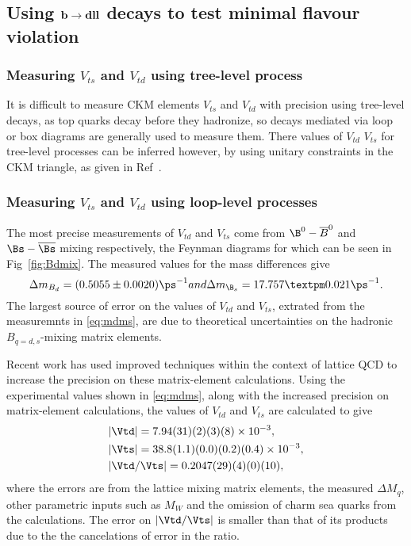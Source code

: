 \subsection{Using $\bf{b\to dll}$ decays to test minimal flavour
violation}
\subsubsection{Measuring $V_{ts}$ and $V_{td}$ using tree-level process}
It is difficult to measure CKM elements $V_{ts}$ and $V_{td}$ with
precision using tree-level decays, as top quarks decay before they
hadronize,  so decays mediated via loop or box diagrams are generally used to
measure them. There values of $V_{td}$ $V_{ts}$ for tree-level
processes can be inferred however, by using unitary constraints
in the CKM triangle, as given in Ref~\cite{ckm}.
\subsubsection{Measuring $V_{ts}$ and $V_{td}$ using loop-level processes}
\label{subsubsec:loop}
The most precise measurements of $V_{td}$ and $V_{ts}$ come from
$\B^{0}-\overline{B}^{0}$ and $\Bs-\overline{\Bs}$ mixing
respectively, the Feynman diagrams for which can be seen in
Fig~\ref{fig:Bdmix}.
The measured values for the mass differences give \cite{pdg} \cite{bslhcb}
\begin{equation}
  \Delta m_{B_{d}} = (0.5055\pm0.0020)\ps^{-1}  $$and$$
\Delta m_{\B_{s}} = 17.757 ± 0.021\ps^{-1}.
\label{eq:mdms}
\end{equation}
The largest source of error on the values of $V_{td}$ and $V_{ts}$,
extrated from the measuremnts in \autoref{eq:mdms}, are due to theoretical uncertainties on the hadronic $B_{q = d,s}$-mixing matrix elements.


Recent work \cite{vtdvts} has used improved
techniques within the context of lattice QCD to increase the
precision on these  matrix-element calculations. Using the
experimental values shown in \autoref{eq:mdms}, along with the
increased precision on matrix-element calculations, the values of
$V_{td}$ and $V_{ts}$ are calculated to give
\begin{equation}
  \begin{split}
    & |\Vtd| = 7.94(31)(2)(3)(8)\times 10^{-3},\\
& |\Vts| = 38.8(1.1)(0.0)(0.2)(0.4)\times 10^{-3},\\
& |\Vtd/\Vts| = 0.2047(29)(4)(0)(10),
  \end{split}
\end{equation}
where the errors are from the lattice mixing matrix elements, the measured $\Delta M_{q}$, other parametric inputs such as $M_{W}$ and the omission of charm sea quarks from the calculations. The error on $|\Vtd/\Vts|$ is smaller than that of its products due to the the cancelations of error in the ratio.

